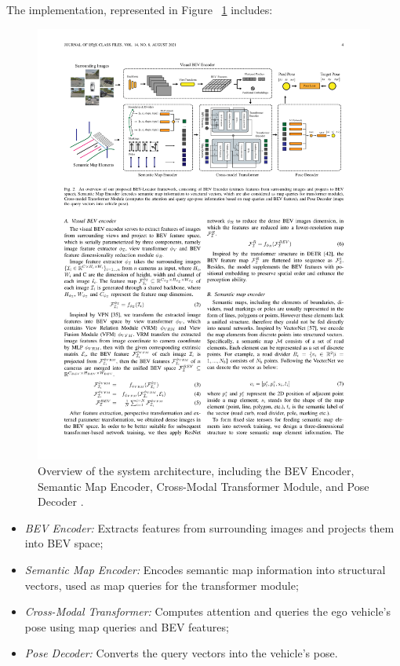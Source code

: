 The implementation, represented in Figure ~\ref{fig:bev-locator} includes:
\begin{figure}[H]
    \centering
    \includegraphics[width=1\linewidth]{LateX//figs/bevlocator.pdf}
    \caption{Overview of the system architecture, including the BEV Encoder, Semantic Map Encoder, Cross-Modal Transformer Module, and Pose Decoder \cite{zhang2022bevlocatorendtoendvisualsemantic}.}
    \label{fig:bev-locator}
\end{figure}

\begin{itemize}
    \item \textit{BEV Encoder:} Extracts features from surrounding images and projects them into BEV space;
    \item \textit{Semantic Map Encoder:} Encodes semantic map information into structural vectors, used as map queries for the transformer module;
    \item \textit{Cross-Modal Transformer:} Computes attention and queries the ego vehicle's pose using map queries and BEV features;
    \item \textit{Pose Decoder:} Converts the query vectors into the vehicle's pose.
\end{itemize}

